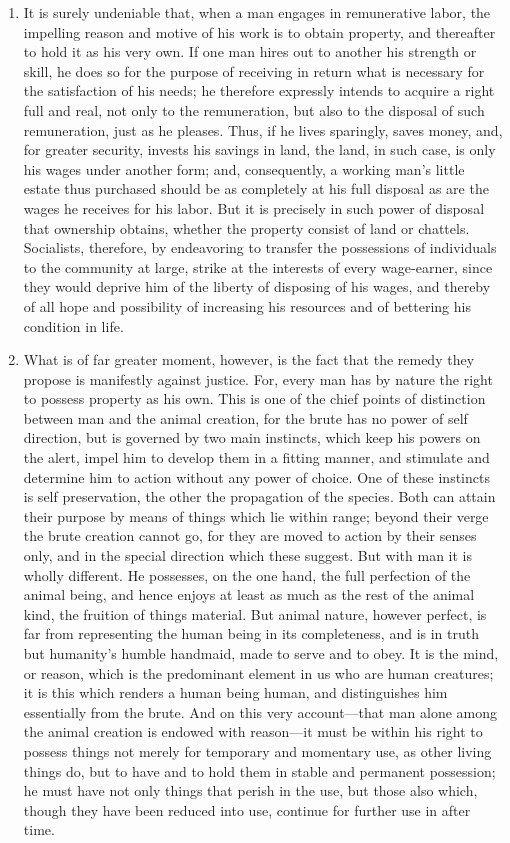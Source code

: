 \documentclass{book}
\begin{document}
\begin{enumerate}
	\item It is surely undeniable that, when a man engages in remunerative labor, the impelling reason and motive of his work is to obtain property, and thereafter to hold it as his very own. If one man hires out to another his strength or skill, he does so for the purpose of receiving in return what is necessary for the satisfaction of his needs; he therefore expressly intends to acquire a right full and real, not only to the remuneration, but also to the disposal of such remuneration, just as he pleases. Thus, if he lives sparingly, saves money, and, for greater security, invests his savings in land, the land, in such case, is only his wages under another form; and, consequently, a working man’s little estate thus purchased should be as completely at his full disposal as are the wages he receives for his labor. But it is precisely in such power of disposal that ownership obtains, whether the property consist of land or chattels. Socialists, therefore, by endeavoring to transfer the possessions of individuals to the community at large, strike at the interests of every wage-earner, since they would deprive him of the liberty of disposing of his wages, and thereby of all hope and possibility of increasing his resources and of bettering his condition in life.


	\item What is of far greater moment, however, is the fact that the remedy they propose is manifestly against justice. For, every man has by nature the right to possess property as his own. This is one of the chief points of distinction between man and the animal creation, for the brute has no power of self direction, but is governed by two main instincts, which keep his powers on the alert, impel him to develop them in a fitting manner, and stimulate and determine him to action without any power of choice. One of these instincts is self preservation, the other the propagation of the species. Both can attain their purpose by means of things which lie within range; beyond their verge the brute creation cannot go, for they are moved to action by their senses only, and in the special direction which these suggest. But with man it is wholly different. He possesses, on the one hand, the full perfection of the animal being, and hence enjoys at least as much as the rest of the animal kind, the fruition of things material. But animal nature, however perfect, is far from representing the human being in its completeness, and is in truth but humanity’s humble handmaid, made to serve and to obey. It is the mind, or reason, which is the predominant element in us who are human creatures; it is this which renders a human being human, and distinguishes him essentially from the brute. And on this very account—that man alone among the animal creation is endowed with reason—it must be within his right to possess things not merely for temporary and momentary use, as other living things do, but to have and to hold them in stable and permanent possession; he must have not only things that perish in the use, but those also which, though they have been reduced into use, continue for further use in after time.



\end{enumerate}
\end{document}
